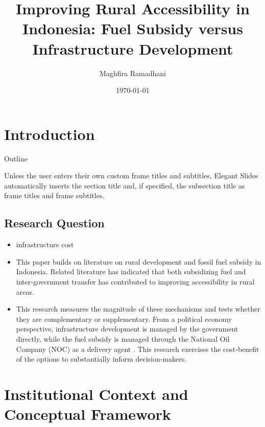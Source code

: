 \documentclass[
10pt,notheorems,compress,hyperref={pdfauthor=Maghfira Ramadhani}
]{beamer}
\title[
]{Improving Rural Accessibility in Indonesia: Fuel Subsidy versus Infrastructure Development}
\author[
]{
    Maghfira Ramadhani 
}
\institute{
    School of Economics, \\
    Georgia Institute of Technology}
\date{\today}
\begin{document}
{
\begin{frame}
  \titlepage
\end{frame}
}
\addtocounter{framenumber}{-1}

\section{Introduction}
{
\begin{frame}{Outline}
    \tableofcontents%
\end{frame}
}

\begin{frame}
    Unless the user enters their own custom frame titles and subtitles, Elegant Slides automatically inserts the section title and, if specified, the subsection title as frame titles and frame subtitles.
\end{frame}

\subsection{Research Question}
\begin{frame}
\begin{itemize}
    \item infrastructure \up \so cost \up \citet{hartojo_2022}
    \item This paper builds on literature on rural development and fossil fuel subsidy in Indonesia. Related literature has indicated that both subsidizing fuel and inter-government transfer has contributed to improving accessibility in rural areas. 
    \item This research measures the magnitude of these mechanisms and tests whether they are complementary or supplementary. From a political economy perspective, infrastructure development is managed by the government directly, while the fuel subsidy is managed through the National Oil Company (NOC) as a delivery agent \citet{ichsan_2022}. This research exercises the cost-benefit of the options to substantially inform decision-makers.
\end{itemize}
\end{frame}

\section{Institutional Context and Conceptual Framework}
\end{document}

